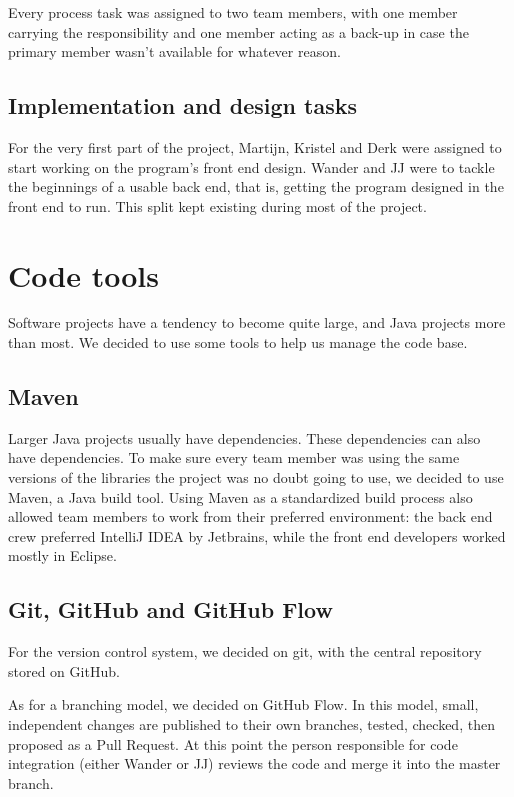 Every process task was assigned to two team members, with one member carrying the responsibility and one member acting as a back-up in case the primary member wasn't available for whatever reason.

\subsection{Implementation and design tasks}

For the very first part of the project, Martijn, Kristel and Derk were assigned to start working on the program's front end design. Wander and JJ were to tackle the beginnings of a usable back end, that is, getting the program designed in the front end to run. This split kept existing during most of the project.

\section{Code tools}

Software projects have a tendency to become quite large, and Java projects more than most. We decided to use some tools to help us manage the code base.

\subsection{Maven}

Larger Java projects usually have dependencies. These dependencies can also have dependencies. To make sure every team member was using the same versions of the libraries the project was no doubt going to use, we decided to use Maven, a Java build tool. Using Maven as a standardized build process also allowed team members to work from their preferred environment: the back end crew preferred IntelliJ IDEA by Jetbrains, while the front end developers worked mostly in Eclipse. 

\subsection{Git, GitHub and GitHub Flow}

For the version control system, we decided on git, with the central repository stored on GitHub.  

As for a branching model, we decided on GitHub Flow\cite{githubflow}. In this model, small, independent changes are published to their own branches, tested, checked, then proposed as a Pull Request. At this point the person responsible for code integration (either Wander or JJ) reviews the code and merge it into the master branch. 

